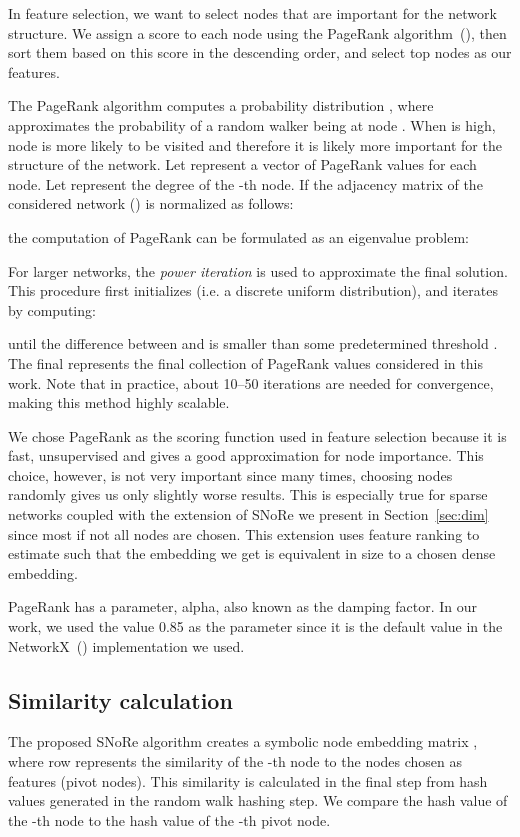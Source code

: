 \documentclass[twoside,11pt]{article}
\begin{document}
In feature selection, we want to select nodes that are important for the network structure. We assign a score to each node using the PageRank algorithm~(\cite{ilprints422}), then sort them based on this score in the descending order, and select top  nodes as our features.

The PageRank algorithm computes a probability distribution , where  approximates the probability of a random walker being at  node . When  is high, node  is more likely to be visited and therefore it is likely more important for the structure of the network. Let  represent a vector of PageRank values for each node. Let  represent the degree of the -th node. If the adjacency matrix of the considered network () is normalized as follows:

\noindent the computation of PageRank can be formulated as an eigenvalue problem:

For larger networks, the \emph{power iteration} is used to approximate the final solution. This procedure first initializes  (i.e. a discrete uniform distribution), and iterates by computing:

\noindent until the difference between  and  is smaller than some predetermined threshold . The final  represents the final collection of PageRank values considered in this work. Note that in practice, about 10--50 iterations are needed for convergence, making this method highly scalable.

We chose PageRank as the scoring function used in feature selection because it is fast, unsupervised and gives a good approximation for node importance. This choice, however, is not very important since many times, choosing nodes randomly gives us only slightly worse results. This is especially true for sparse networks coupled with the extension of SNoRe we present in Section~\ref{sec:dim} since most if not all nodes are chosen. This extension uses feature ranking to estimate  such that the embedding we get is equivalent in size to a chosen dense embedding.

PageRank has a parameter, alpha, also known as the damping factor. In our work, we used the value 0.85 as the parameter since it is the default value in the NetworkX~(\cite{SciPyProceedings_11}) implementation we used.

\subsection{Similarity calculation}
\label{sec:similaritycalc}
The proposed SNoRe algorithm creates a symbolic node embedding matrix , where row  represents the similarity of the -th node to the nodes chosen as features (pivot nodes). This similarity is calculated in the final step from hash values  generated in the random walk hashing step. We compare the hash value  of the -th node to the hash value  of the -th pivot node.
\end{document}
